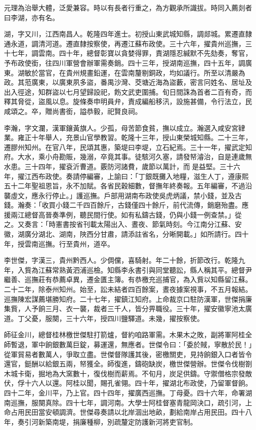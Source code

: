 \begin{pinyinscope}
元理為治舉大體，泛愛兼容。時以有長者行重之，為方觀承所識拔。時同入薦剡者曰李湖，亦有名。

湖，字又川，江西南昌人。乾隆四年進士。初授山東武城知縣，調郯城。累遷直隸通永道，調清河道。遷直隸按察使，再遷江蘇布政使。三十六年，擢貴州巡撫，三十七年，調雲南。四十年，總督彰寶以貪婪得罪，責湖隱忍緘默不先劾奏，奪官，予布政使銜，往四川軍營會辦軍需奏銷。四十三年，授湖南巡撫，四十五年，調廣東。湖敏於當官，在貴州規畫鉛運，在雲南釐剔銅政，均如議行。所至以清嚴為政。其蒞廣東，以廣東夙多盜，番禺沙灣、茭塘近海為盜藪，密言冋姓名、居址及出入徑途，知群盜以七月望歸設祀，飭文武吏圍捕。旬日間誅為首者二百有奇，而釋其脅從，盜風以息。旋條奏申明員弁，責成編船移汛，設施甚備，令行法立，民咸頌之。卒，贈尚書銜，謚恭毅，祀賢良祠。

李瀚，字文瀾，漢軍鑲黃旗人。少孤，母苦節食貧，撫以成立。瀚選入咸安宮肄業。雍正十年舉人，充景山官學教習。乾隆十三年，授山東榮城知縣。二十三年，遷膠州知州。在官八年，民頌其惠，築堤曰李堤，立石紀焉。三十一年，擢武定知府。大水，乘小舟勘賑，幾溺，卒竟其事。徒駭河久塞，請發帑濬治，自是連歲無水患。三十四年，擢袞沂曹道。覈防河諸費，歲節以萬計，而是益堅。三十六年，擢江西布政使。奏請停編審，上諭曰：「丁銀既攤入地糧，滋生人丁，遵康熙五十二年聖祖恩旨，永不加賦。各省民穀細數，督撫年終奏報。五年編審，不過沿襲虛文，應永行停止。」護巡撫。戶部用湖南布政使吳虎炳議，禁小錢，並及古錢。瀚奏：「收買小錢二千四百餘斤，古錢僅四十餘斤，前代流傳，銷磨殆盡。應援兩江總督高晉奏準例，聽民間行使。如有私鑄古錢，仍與小錢一例查禁。」從之。又奏言：「時憲書按省刊載太陽出入、晝夜、節氣時刻。今江南分江蘇、安徽，湖廣分湖北、湖南，陜西分甘肅，請添註省名，分晰開載。」如所請行。四十年，授雲南巡撫。行至貴州，道卒。

李世傑，字漢三，貴州黔西人。少倜儻，喜騎射。年二十餘，折節改行。乾隆九年，入貲為江蘇常熟黃泗浦巡檢。知縣李永書引與同堂聽訟，縣人稱其平。總督尹繼善、巡撫莊有恭薦卓異，遷金匱主簿。有恭檄充巡捕官，為入貲以知縣留江蘇。二十二年，除泰州知州。始至，訟未結者四百餘案，晝夜據案視事，不五月報結。巡撫陳宏謀薦堪勝知府。二十七年，擢鎮江知府。上命裁京口駐防漢軍，世傑捐廉集貲，人予餉三月、衣一襲，裁者三千人，皆分畀職役。三十年，擢安徽寧池太廣道。丁父憂，服闋，三十六年，授四川鹽驛道。未幾，擢按察使。

師征金川，總督桂林檄世傑駐打箭爐，督約咱路軍需。木果木之敗，副將軍阿桂全師暫退，軍中餉銀數萬巨錠，募運還，無應者。世傑令曰：「委於賊，寧散於民！」從軍貿易者數萬人，爭取立盡。世傑督隊護其後，密檄關吏，見持餉銀入口者皆令還官，鋌酬以給銀五兩，帑獲全。師復進，鑄砲缺炭，檄世傑營辦。世傑令伐樹劄木城卡衛，掘地為大窯數十，復伐樹而薪焉。不旬月，炭足供鑄。守禦僧格宗發敵伏，俘十六人以還。阿桂以聞，賜孔雀翎。四十年，擢湖北布政使，乃留軍督餉。四十二年，金川平，乃上官。四十四年，擢廣西巡撫。丁母憂。四十六年，命署湖南巡撫，服闋真除。四十七年，調河南。大學士阿桂督塞青龍岡決口，疏引河，上命占用民田當安頓調濟。世傑尋奏請以北岸涸出地畝，劃給南岸占用民田。四十八年，奏引河新築南堤，捐廉種柳，別疏釐定防護新河將吏官制。


\end{pinyinscope}
